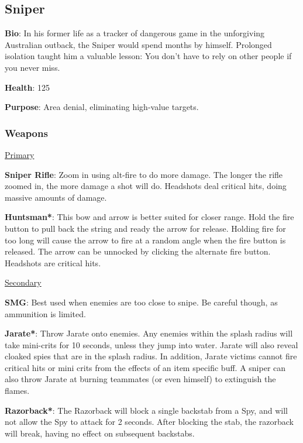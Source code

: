 \subsection{Sniper}
{\bf Bio}:
In his former life as a tracker of dangerous game in the unforgiving Australian outback, the Sniper would spend months by himself. Prolonged isolation taught him a valuable lesson: You don't have to rely on other people if you never miss.

{\bf Health}: 125

{\bf Purpose}:
Area denial, eliminating high-value targets.

\subsubsection {Weapons}

\begin {center}
\underline {Primary}
\end {center}

{\bf Sniper Rifle}: Zoom in using alt-fire to do more damage. The longer the rifle zoomed in, the more damage a shot will do. Headshots deal critical hits, doing massive amounts of damage.

{\bf Huntsman*}: This bow and arrow is better suited for closer range. Hold the fire button to pull back the string and ready the arrow for release. Holding fire for too long will cause the arrow to fire at a random angle when the fire button is released. The arrow can be unnocked by clicking the alternate fire button. Headshots are critical hits.

\begin {center}
\underline {Secondary}
\end {center}

{\bf SMG}: Best used when enemies are too close to snipe. Be careful though, as ammunition is limited.

{\bf Jarate*}: Throw Jarate onto enemies. Any enemies within the splash radius will take mini-crits for 10 seconds, unless they jump into water. Jarate will also reveal cloaked spies that are in the splash radius. In addition, Jarate victims cannot fire critical hits or mini crits from the effects of an item specific buff. A sniper can also throw Jarate at burning teammates (or even himself) to extinguish the flames. 

{\bf Razorback*}: The Razorback will block a single backstab from a Spy, and will not allow the Spy to attack for 2 seconds. After blocking the stab, the razorback will break, having no effect on subsequent backstabs.

